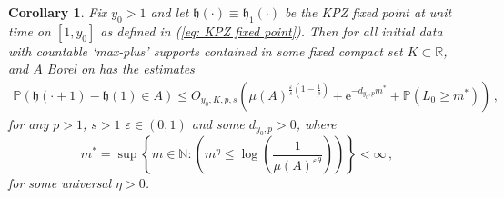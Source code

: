 \documentclass[11pt, reqno]{amsart}
\numberwithin{equation}{section}
\newcounter{dummy} \numberwithin{dummy}{section}
\newtheorem{corollary}[dummy]{Corollary}
\newcommand{\R}{\ensuremath{\mathbb{R}}}
\newcommand{\PP}{\ensuremath{\mathbb{P}}}
\begin{document}
\begin{corollary}\label{cor: KPZ log comparison BM}
 Fix $y_0>1$ and let $\mathfrak{h}(\cdot)\equiv \mathfrak{h}_1(\cdot)$ be the KPZ fixed point at unit time on $[1,y_0]$ as defined in (\ref{eq: KPZ fixed point}). Then for all initial data with countable `max-plus' supports contained in some fixed compact set $K\subset \R$, and $A$ Borel on has the estimates 
\begin{equation*}
\begin{array}{cc}
     \PP(\mathfrak{h}(\cdot + 1)-\mathfrak{h}(1)\in A) \le O_{y_0, K, p,s} \left(\mu(A)^{\frac{\varepsilon}{s}(1-\frac{1}{p})}+ \mathrm{e}^{-d_{y_0, p}m^*} +  \PP(L_0\geq m^*)\right)\,,
\end{array}
\end{equation*}
for any $p>1$, $s>1$  $\varepsilon \in (0,1)$ and some $d_{y_0, p}> 0$, where
\begin{equation*}
m^* =  \displaystyle \sup \left\{m\in \mathbb{N} :  \left(m^\eta \le \log \left(\frac{1}{ \mu(A)^{\varepsilon\theta}}\right)\right)\right\}<\infty\,,
\end{equation*}
for some universal $\eta > 0$.
\end{corollary}
\end{document}
